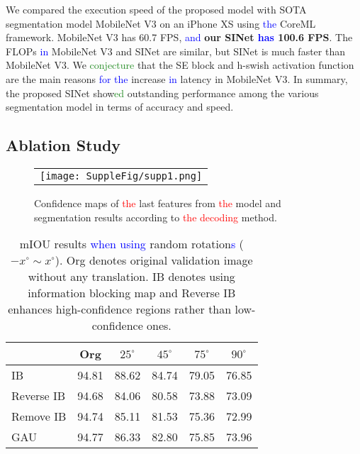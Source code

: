\documentclass[10pt,twocolumn,letterpaper]{article}
\newcommand\Lars[1]{\textcolor{blue}{#1}}
\newcommand\yj[1]{\textcolor{ForestGreen}{#1}}
\newcommand\nj[1]{\textcolor{red}{#1}}
\newcommand\Lars[1]{#1}
\newcommand\yj[1]{#1}
\newcommand\nj[1]{#1}
\begin{document}
We compared the execution speed of the proposed model with SOTA segmentation model MobileNet V3 on an iPhone XS using \Lars{the} CoreML framework.
MobileNet V3 has 60.7 FPS, \Lars{and} \textbf{our SINet \Lars{has} 100.6 FPS}.
The FLOPs \Lars{in} MobileNet V3 and SINet are similar, but SINet is much faster than MobileNet V3.
We \yj{conjecture} that the SE block and h-swish activation function are the main reasons \Lars{for the} increase \Lars{in} latency in MobileNet V3.
In summary, the proposed SINet show\yj{ed} outstanding performance among the various segmentation model in terms of accuracy and speed.


\subsection{Ablation Study}
\label{sec:ablation}


\begin{figure}[t]
\begin{center}

\begin{tabular}{c}
    \texttt{[image: SuppleFig/supp1.png]}\\

        \end{tabular}\end{center}
\vspace{-2mm}
   \caption{Confidence maps of \nj{the} last features from \nj{the} model and segmentation results according to \nj{the decoding} method.}
\label{fig:ablation_IB}
\end{figure}

\begin{table}[t]
  \begin{center}
   \begin{tabular}{l | ccccc}
    \hline
          & Org    & $25^\circ$    & $45^\circ$   & $75^\circ$    & $90^\circ$ \\
          \hline \hline
    IB    & 94.81 & 88.62 & 84.74 & 79.05 & 76.85 \\
    Reverse IB & 94.68 & 84.06 & 80.58 & 73.88 & 73.09 \\
    Remove IB   & 94.74 & 85.11 & 81.53 & 75.36 & 72.99 \\
    GAU \cite{li2018pyramid}   & 94.77 & 86.33 & 82.80  & 75.85 & 73.96 \\

    \hline
    \end{tabular}

  \end{center}
   
  \caption{mIOU results \Lars{when using} random rotation\Lars{s} ($-x^\circ \sim x^\circ $). Org denotes original validation image without any translation. IB denotes using information blocking map and Reverse IB enhances high-confidence regions rather than low-confidence ones.}
\label{tab:IBablation}\end{table}
\end{document}
